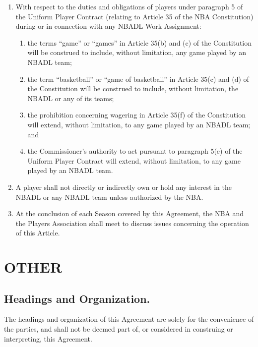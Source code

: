 \documentclass[
]{book}
\providecommand{\tightlist}{%
  \setlength{\itemsep}{0pt}\setlength{\parskip}{0pt}}
\begin{document}
\begin{enumerate}
\def\labelenumi{(\alph{enumi})}
\tightlist
\item
  With respect to the duties and obligations of players under paragraph 5 of the Uniform Player Contract (relating to Article 35 of the NBA Constitution) during or in connection with any NBADL Work Assignment:

  \begin{enumerate}
  \def\labelenumii{(\roman{enumii})}
  \tightlist
  \item
    the terms ``game'' or ``games'' in Article 35(b) and (c) of the Constitution will be construed to include, without limitation, any game played by an NBADL team;
  \item
    the term ``basketball'' or ``game of basketball'' in Article 35(c) and (d) of the Constitution will be construed to include, without limitation, the NBADL or any of its teams;
  \item
    the prohibition concerning wagering in Article 35(f) of the Constitution will extend, without limitation, to any game played by an NBADL team; and
  \item
    the Commissioner's authority to act pursuant to paragraph 5(e) of the Uniform Player Contract will extend, without limitation, to any game played by an NBADL team.
  \end{enumerate}
\item
  A player shall not directly or indirectly own or hold any interest in the NBADL or any NBADL team unless authorized by the NBA.
\item
  At the conclusion of each Season covered by this Agreement, the NBA and the Players Association shall meet to discuss issues concerning the operation of this Article.
\end{enumerate}

\hypertarget{other}{%
\chapter{OTHER}\label{other}}

\hypertarget{headings-and-organization.}{%
\section{Headings and Organization.}\label{headings-and-organization.}}

The headings and organization of this Agreement are solely for the convenience of the parties, and shall not be deemed part of, or considered in construing or interpreting, this Agreement.
\end{document}
